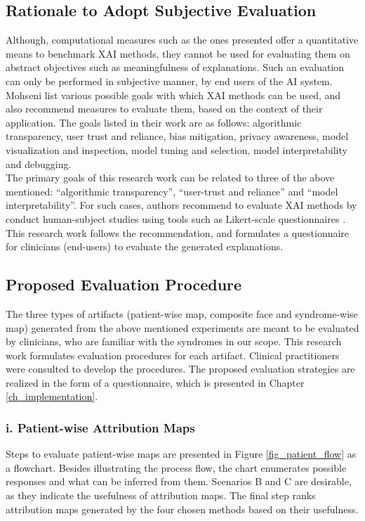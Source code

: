 \documentclass[../report.tex]{subfiles}
\begin{document}
    \subsection{Rationale to Adopt Subjective Evaluation}
    Although, computational measures such as the ones presented offer a quantitative means to benchmark XAI methods, they cannot be used for evaluating them on abstract objectives such as meaningfulness of explanations. Such an evaluation can only be performed in subjective manner, by end users of the AI system.\\
    Mohseni \etal \cite{mohseni2021multidisciplinary} list various possible goals with which XAI methods can be used, and also recommend measures to evaluate them, based on the context of their application. The goals listed in their work are as follows: algorithmic transparency, user trust and reliance, bias mitigation, privacy awareness, model visualization and inspection, model tuning and selection, model interpretability and debugging.\\ 
    The primary goals of this research work can be related to three of the above mentioned: \enquote{algorithmic transparency}, \enquote{user-trust and reliance} and \enquote{model interpretability}. For such cases, authors recommend to evaluate XAI methods by conduct human-subject studies using tools such as Likert-scale questionnaires \cite{likert_scale}. This research work follows the recommendation, and formulates a questionnaire for clinicians (end-users) to evaluate the generated explanations. 
    \subsection{Proposed Evaluation Procedure}
    The three types of artifacts (patient-wise map, composite face and syndrome-wise map) generated from the above mentioned experiments are meant to be evaluated by clinicians, who are familiar with the syndromes in our scope. This research work formulates evaluation procedures for each artifact. Clinical practitioners were consulted to develop the procedures. The proposed evaluation strategies are realized in the form of a questionnaire, which is presented in Chapter \ref{ch_implementation}.
    \subsubsection{i. Patient-wise Attribution Maps}
    Steps to evaluate patient-wise maps are presented in Figure \ref{fig_patient_flow} as a flowchart. Besides illustrating the process flow, the chart enumerates possible responses and what can be inferred from them. Scenarios B and C are desirable, as they indicate the usefulness of attribution maps. The final step ranks attribution maps generated by the four chosen methods based on their usefulness.
    
\end{document}
